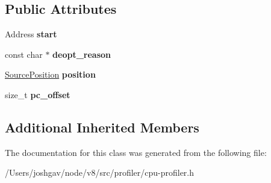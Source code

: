 \subsection*{Public Attributes}
\begin{DoxyCompactItemize}
\item 
Address {\bfseries start}\hypertarget{classv8_1_1internal_1_1_code_deopt_event_record_ae98b3236b32cec8757f2d4e95a5b916d}{}\label{classv8_1_1internal_1_1_code_deopt_event_record_ae98b3236b32cec8757f2d4e95a5b916d}

\item 
const char $\ast$ {\bfseries deopt\+\_\+reason}\hypertarget{classv8_1_1internal_1_1_code_deopt_event_record_a2389264ef7bcc34febd142099109dac4}{}\label{classv8_1_1internal_1_1_code_deopt_event_record_a2389264ef7bcc34febd142099109dac4}

\item 
\hyperlink{classv8_1_1internal_1_1_source_position}{Source\+Position} {\bfseries position}\hypertarget{classv8_1_1internal_1_1_code_deopt_event_record_a11f8ba7b50064d7887d8a3a684b03bc0}{}\label{classv8_1_1internal_1_1_code_deopt_event_record_a11f8ba7b50064d7887d8a3a684b03bc0}

\item 
size\+\_\+t {\bfseries pc\+\_\+offset}\hypertarget{classv8_1_1internal_1_1_code_deopt_event_record_a34039042bb7d6caf1255db894ff4c52a}{}\label{classv8_1_1internal_1_1_code_deopt_event_record_a34039042bb7d6caf1255db894ff4c52a}

\end{DoxyCompactItemize}
\subsection*{Additional Inherited Members}


The documentation for this class was generated from the following file\+:\begin{DoxyCompactItemize}
\item 
/\+Users/joshgav/node/v8/src/profiler/cpu-\/profiler.\+h\end{DoxyCompactItemize}

